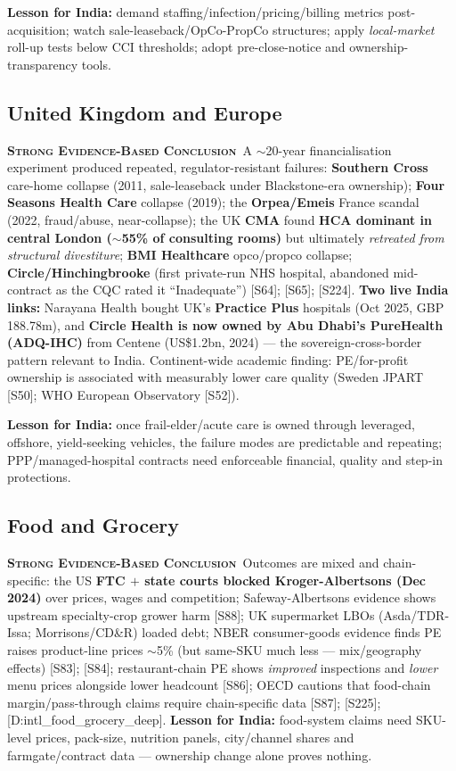 \documentclass[11pt,a4paper]{article}
\newcommand{\SE}{\textcolor{secol}{\textsc{\textbf{Strong Evidence-Based Conclusion}}}}
\newcommand{\cs}[1]{\textnormal{[#1]}}
\begin{document}
\textbf{Lesson for India:} demand staffing/infection/pricing/billing metrics post-acquisition; watch sale-leaseback/OpCo-PropCo structures; apply \emph{local-market} roll-up tests below CCI thresholds; adopt pre-close-notice and ownership-transparency tools.

\subsection{United Kingdom and Europe}

\SE\ A $\sim$20-year financialisation experiment produced repeated, regulator-resistant failures: \textbf{Southern Cross} care-home collapse (2011, sale-leaseback under Blackstone-era ownership); \textbf{Four Seasons Health Care} collapse (2019); the \textbf{Orpea/Emeis} France scandal (2022, fraud/abuse, near-collapse); the UK \textbf{CMA} found \textbf{HCA dominant in central London ($\sim$55\% of consulting rooms)} but ultimately \emph{retreated from structural divestiture}; \textbf{BMI Healthcare} opco/propco collapse; \textbf{Circle/Hinchingbrooke} (first private-run NHS hospital, abandoned mid-contract as the CQC rated it ``Inadequate'') \cs{S64}; \cs{S65}; \cs{S224}. \textbf{Two live India links:} Narayana Health bought UK's \textbf{Practice Plus} hospitals (Oct 2025, GBP 188.78m), and \textbf{Circle Health is now owned by Abu Dhabi's PureHealth (ADQ-IHC)} from Centene (US\$1.2bn, 2024) --- the sovereign-cross-border pattern relevant to India. Continent-wide academic finding: PE/for-profit ownership is associated with measurably lower care quality (Sweden JPART \cs{S50}; WHO European Observatory \cs{S52}).

\textbf{Lesson for India:} once frail-elder/acute care is owned through leveraged, offshore, yield-seeking vehicles, the failure modes are predictable and repeating; PPP/managed-hospital contracts need enforceable financial, quality and step-in protections.

\subsection{Food and Grocery}

\SE\ Outcomes are mixed and chain-specific: the US \textbf{FTC $+$ state courts blocked Kroger-Albertsons (Dec 2024)} over prices, wages and competition; Safeway-Albertsons evidence shows upstream specialty-crop grower harm \cs{S88}; UK supermarket LBOs (Asda/TDR-Issa; Morrisons/CD\&R) loaded debt; NBER consumer-goods evidence finds PE raises product-line prices $\sim$5\% (but same-SKU much less --- mix/geography effects) \cs{S83}; \cs{S84}; restaurant-chain PE shows \emph{improved} inspections and \emph{lower} menu prices alongside lower headcount \cs{S86}; OECD cautions that food-chain margin/pass-through claims require chain-specific data \cs{S87}; \cs{S225}; \cs{D:intl\_food\_grocery\_deep}. \textbf{Lesson for India:} food-system claims need SKU-level prices, pack-size, nutrition panels, city/channel shares and farmgate/contract data --- ownership change alone proves nothing.
\end{document}
